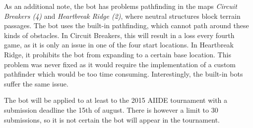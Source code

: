 As an additional note, the bot has problems pathfinding in the maps \emph{Circuit Breakers (4)} and \emph{Heartbreak Ridge (2)}, where neutral structures block terrain passages. The bot uses the built-in pathfinding, which cannot path around these kinds of obstacles. In Circuit Breakers, this will result in a loss every fourth game, as it is only an issue in one of the four start locations. In Heartbreak Ridge, it prohibits the bot from expanding to a certain base location. This problem was never fixed as it would require the implementation of a custom pathfinder which would be too time consuming. Interestingly, the built-in bots suffer the same issue.

The bot will be applied to at least to the 2015 AIIDE tournament with a submission deadline the 15th of august. There is however a limit to 30 submissions, so it is not certain the bot will appear in the tournament.